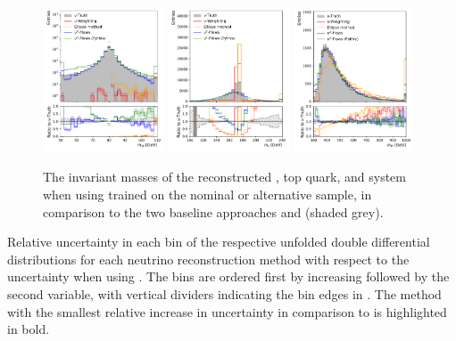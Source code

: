 \begin{figure}[htbp]
    \centering
    \includegraphics[width=0.32\textwidth]{Figures/neutrino_unfolding/pythia8/W_plusW_minus_m.pdf}
    \includegraphics[width=0.32\textwidth]{Figures/neutrino_unfolding/pythia8/topanti_top_m.pdf}
    \includegraphics[width=0.32\textwidth]{Figures/neutrino_unfolding/pythia8/ttbar_m.pdf}
    \caption{
        The invariant masses of the reconstructed \Wboson, top quark, and \ttbar system when using \vvflows trained on the nominal or alternative sample, in comparison to the two baseline approaches and \vtruth (shaded grey).
    }
    \label{fig:pythiattbar}
\end{figure}

\begin{table}[thp]
    \centering
    \caption{Relative uncertainty in each bin of the respective unfolded double differential distributions for each neutrino reconstruction method with respect to the uncertainty when using \vtruth. The bins are ordered first by increasing \mttbar followed by the second variable, with vertical dividers indicating the bin edges in \mttbar. The method with the smallest relative increase in uncertainty in comparison to \vtruth is highlighted in bold.}
    \label{tab:app:rel_unfold_uncerts}
    \resizebox{\textwidth}{!}{
        
    }
\end{table}

